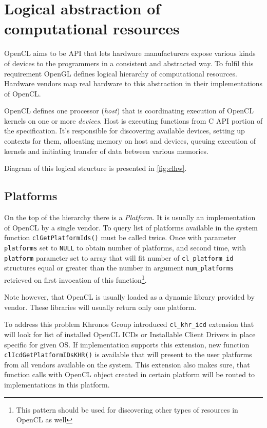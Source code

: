 \section{Logical abstraction of computational resources}
\label{sec:cllogicalabstraction}
OpenCL aims to be API that lets hardware manufacturers expose various kinds of
devices to the programmers in a consistent and abstracted way. To fulfil this
requirement OpenGL defines logical hierarchy of computational resources.
Hardware vendors map real hardware to this abstraction in their implementations
of OpenCL.

OpenCL defines one processor (\emph{host}) that is coordinating execution of
OpenCL kernels on one or more \emph{devices}. Host is executing functions from
C API portion of the specification. It's responsible for discovering available
devices, setting up contexts for them, allocating memory on host and devices,
queuing execution of kernels and initiating transfer of data between various
memories.

Diagram of this logical structure is presented in \autoref{fig:clhw}.

\subsection{Platforms}

On the top of the hierarchy there is a \emph{Platform}. It is usually an implementation
of OpenCL by a single vendor. To query list of platforms available in the system
function \texttt{clGet\-PlatformIds()} must be called twice. Once with parameter
\texttt{platforms} set to \texttt{NULL} to obtain number of platforms, and
second time, with \texttt{platform} parameter set to array that will fit
number of \texttt{cl\_platform\_id} structures equal or greater than the number
in argument \texttt{num\_platforms} retrieved on first invocation of this
function\footnote{This pattern should be used for discovering other types of resources
in OpenCL as well}.

Note however, that OpenCL is usually loaded as a dynamic library provided by
vendor. These libraries will usually return only one platform.

To address this problem Khronos Group introduced \texttt{cl\_khr\_icd} extension
that will look for list of installed OpenCL
ICDs or Installable Client Drivers in place specific for given OS. If
implementation supports this extension, new function \texttt{clIcd\-Get\-Platform\-IDsKHR()}
is available that will present to the user platforms from all vendors available
on the system. This extension also makes sure, that function calls with OpenCL
object created in certain platform will be routed to implementations in this
platform.

